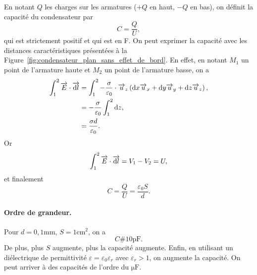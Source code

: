             En notant $Q$ les charges sur les armatures ($+Q$ en haut, $-Q$ en bas), on définit la capacité du condensateur par 
            \begin{equation*}
                \boxed{
                    C=\frac{Q}{U},
                }
            \end{equation*}
            qui est strictement positif et qui est en \si{\farad}. On peut exprimer la capacité avec les distances caractéristiques présentées à la Figure~\ref{fig:condensateur_plan_sans_effet_de_bord}. En effet, en notant $M_1$ un point de l'armature haute et $M_2$ un point de l'armature basse, on a 
            \begin{align*}
                \int_{1}^{2}\protect\overrightarrow{{E}}\cdot\protect\overrightarrow{{\mathrm{d} l}}
                &=
                \int_{1}^{2}-\frac{\sigma}{\varepsilon_0}\cdot\protect\overrightarrow{{u}}_z\left(\mathrm{d} x\protect\overrightarrow{{u}}_x+\mathrm{d} y\protect\overrightarrow{{u}}_y+\mathrm{d} z\protect\overrightarrow{{u}}_z\right),\\
                &=
                -\frac{\sigma}{\varepsilon_0}\int_{1}^{2}\mathrm{d} z,\\
                &=
                \frac{\sigma d}{\varepsilon_0}.
            \end{align*}
            Or 
            \begin{equation*}
                \int_{1}^{2}\protect\overrightarrow{{E}}\cdot\protect\overrightarrow{{\mathrm{d} l}}=V_1-V_2=U,
            \end{equation*}
            et finalement
            \begin{equation*}
                \boxed{
                    C=\frac{Q}{U}=\frac{\varepsilon_0 S}{d}.
                }
            \end{equation*}

            \paragraph{Ordre de grandeur.} Pour $d=0,1\si{\milli\metre}$, $S=1\si{\centi\metre\squared}$, on a 
            \begin{equation*}
                C\#10\si{\pico\farad}.
            \end{equation*}
            De plus, plus $S$ augmente, plus la capacité augmente. Enfin, en utilisant un diélectrique de permittivité $\varepsilon=\varepsilon_0\varepsilon_r$ avec $\varepsilon_r>1$, on augmente la capacité. On peut arriver à des capacités de l'ordre du $\si{\micro\farad}$.